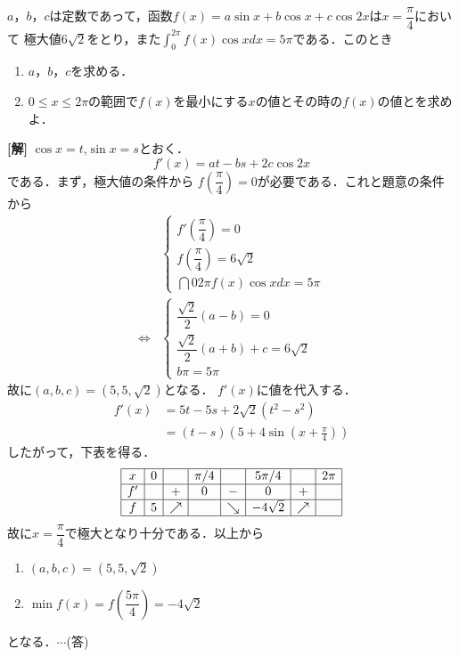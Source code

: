 \documentclass[a4j]{jarticle}
\begin{document}

\begin{oframed}
$a$，$b$，$c$は定数であって，函数$f(x)=a\sin x+b\cos x+c\cos 2x$は$x=\dfrac{\pi}{4}$において
極大値$6\sqrt{2}$をとり，また$\int_0^{2\pi} f(x)\cos x dx=5\pi$である．このとき　\\
\begin{enumerate}[(1)]
\item $a$，$b$，$c$を求める．
\item $0\le x\le 2\pi$の範囲で$f(x)$を最小にする$x$の値とその時の$f(x)$の値とを求めよ．
\end{enumerate}
\end{oframed}
\setlength{\columnseprule}{0.4pt}
\begin{multicols}{2}
{\bf[解]}
     $\cos x=t$,$\sin x=s$とおく．
     \[f'(x)=at-bs+2c\cos 2x\]
     である．まず，極大値の条件から
     $f\left(\dfrac{\pi}{4}\right)=0$が必要である．これと題意の条件から
          \begin{align*}
          &\left\{
               \begin{array}{l}
               f'\left(\dfrac{\pi}{4}\right)=0 \\
               f\left(\dfrac{\pi}{4}\right)=6\sqrt{2} \\
               \dint{0}{2\pi}f(x)\cos x dx=5\pi 
               \end{array}
          \right.  \\
          \Leftrightarrow
          &\left\{
               \begin{array}{l}
               \dfrac{\sqrt{2}}{2}(a-b)=0 \\
               \dfrac{\sqrt{2}}{2}(a+b)+c=6\sqrt{2} \\
               b\pi=5\pi 
               \end{array}
         \right.
         \end{align*}
    故に$(a,b,c)=(5,5,\sqrt{2})$となる．
      $f'(x)$に値を代入する．
          \begin{align*}
          f'(x)&=5t-5s+2\sqrt{2}(t^2-s^2) \\
          &=(t-s)\left(5+4\sin\left(x+\frac{\pi}{4}\right)\right)
          \end{align*}
     したがって，下表を得る．
      \begin{align*}
     \begin{array}{|c|c|c|c|c|c|c|c|} \hline
     x & 0 &    &  \pi/4&     &5\pi/4            &     &2\pi  \\ \hline
     f' &    &+  & 0      & -    & 0                 &+   &        \\ \hline
     f &  5 &\nearrow&        &\searrow &-4\sqrt{2}      &\nearrow&        \\ \hline
     \end{array}
     \end{align*}
     故に$x=\dfrac{\pi}{4}$で極大となり十分である．以上から
     \begin{enumerate}[(1)]
     \item $(a,b,c)=(5,5,\sqrt{2})$ 
     \item $\min f(x)=f\left(\dfrac{5\pi}{4}\right)=-4\sqrt{2}$ 
     \end{enumerate}
     となる．$\cdots$(答)
          \newpage
\end{multicols}
\end{document}
